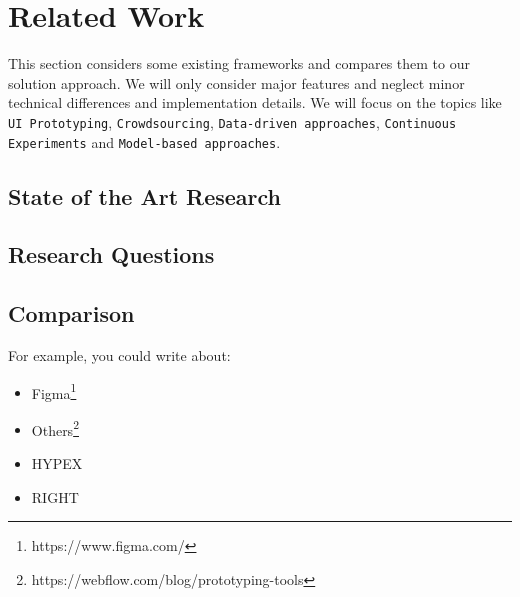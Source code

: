 \chapter{Related Work} \label{chap:csr}

This section considers some existing frameworks and compares them to our solution approach. 
We will only consider major features and neglect minor technical differences and implementation details. 
We will focus on the topics like \texttt{UI Prototyping}, \texttt{Crowdsourcing}, \texttt{Data-driven approaches}, \texttt{Continuous Experiments} and \texttt{Model-based approaches}. 

\section{State of the Art Research}
\section{Research Questions}
\section{Comparison}

For example, you could write about: 
\begin{itemize}
	\item Figma\footnote{https://www.figma.com/}
	\item Others\footnote{https://webflow.com/blog/prototyping-tools} 	
	\item HYPEX \cite{article:hypex:model}
	\item RIGHT \cite{article:right:model}
\end{itemize}